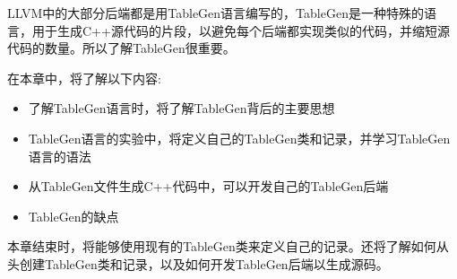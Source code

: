 LLVM中的大部分后端都是用TableGen语言编写的，TableGen是一种特殊的语言，用于生成C++源代码的片段，以避免每个后端都实现类似的代码，并缩短源代码的数量。所以了解TableGen很重要。

在本章中，将了解以下内容:

\begin{itemize}
\item
了解TableGen语言时，将了解TableGen背后的主要思想

\item
TableGen语言的实验中，将定义自己的TableGen类和记录，并学习TableGen语言的语法

\item
从TableGen文件生成C++代码中，可以开发自己的TableGen后端

\item
TableGen的缺点
\end{itemize}

本章结束时，将能够使用现有的TableGen类来定义自己的记录。还将了解如何从头创建TableGen类和记录，以及如何开发TableGen后端以生成源码。














